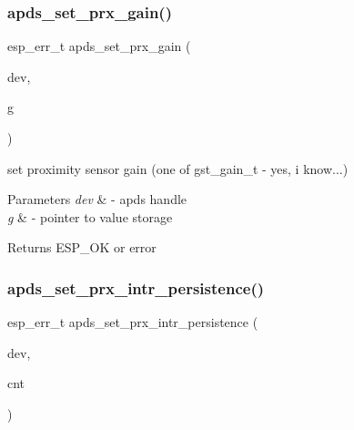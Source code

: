 \subsubsection{\texorpdfstring{apds\+\_\+set\+\_\+prx\+\_\+gain()}{apds\_set\_prx\_gain()}}
{\footnotesize\ttfamily esp\+\_\+err\+\_\+t apds\+\_\+set\+\_\+prx\+\_\+gain (\begin{DoxyParamCaption}\item[{\hyperlink{structAPDS9960__Driver}{A\+P\+D\+S\+\_\+\+D\+EV}}]{dev,  }\item[{gst\+\_\+gain\+\_\+t $\ast$}]{g }\end{DoxyParamCaption})}




\begin{DoxyItemize}
\item set proximity sensor gain (one of gst\+\_\+gain\+\_\+t -\/ yes, i know...) 
\end{DoxyItemize}


\begin{DoxyParams}{Parameters}
{\em dev} & -\/ apds handle \\
\hline
{\em g} & -\/ pointer to value storage \\
\hline
\end{DoxyParams}
\begin{DoxyReturn}{Returns}
E\+S\+P\+\_\+\+OK or error 
\end{DoxyReturn}
\mbox{\label{group__APDS9960__ProximityFunctions_gac96be9e41673bf8cccb3d3ccfa829b7b}} 
\subsubsection{\texorpdfstring{apds\+\_\+set\+\_\+prx\+\_\+intr\+\_\+persistence()}{apds\_set\_prx\_intr\_persistence()}}
{\footnotesize\ttfamily esp\+\_\+err\+\_\+t apds\+\_\+set\+\_\+prx\+\_\+intr\+\_\+persistence (\begin{DoxyParamCaption}\item[{\hyperlink{structAPDS9960__Driver}{A\+P\+D\+S\+\_\+\+D\+EV}}]{dev,  }\item[{\hyperlink{vl53l0x__types_8h_aba7bc1797add20fe3efdf37ced1182c5}{uint8\+\_\+t} $\ast$}]{cnt }\end{DoxyParamCaption})}




